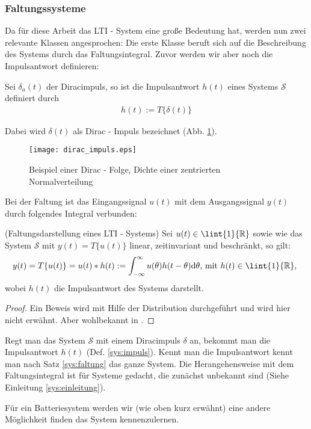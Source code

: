 \subsubsection{Faltungssysteme}
Da für diese Arbeit das LTI - System eine große Bedeutung hat, werden nun zwei relevante Klassen angesprochen: Die erste Klasse beruft sich auf die Beschreibung des Systems durch das Faltungsintegral. Zuvor werden wir aber noch die Impulsantwort definieren:
\begin{defi}\label{sys:impuls}
	Sei $\delta_a(t)$ der Diracimpuls, so ist die Impulsantwort $h(t)$ eines Systems $\mathscr{S}$ definiert durch 
	\begin{align}
		h(t) := T\{\delta(t)\}
	\end{align}
\end{defi}
Dabei wird $\delta(t) $ als Dirac - Impuls bezeichnet (Abb. \ref{fig:dirac}). 
\begin{figure}[ht]
	\texttt{[image: dirac\_impuls.eps]}
	\caption{Beispiel einer Dirac - Folge, Dichte einer zentrierten Normalverteilung}
	\label{fig:dirac}
\end{figure}
Bei der Faltung ist das Eingangssignal $u(t)$ mit dem Ausgangssignal $y(t)$ durch folgendes Integral verbunden:
\begin{satz}(Faltungsdarstellung eines LTI - Systems)\label{sys:faltung}
Sei $u(t) \in \lint{1}{\mathbb{\mathbb{R}}}$ sowie wie das System $\mathscr{S}$ mit $y(t) = T\{u(t)\}$ linear, zeitinvariant und beschränkt, so gilt:
\begin{align}
	y(t) = T\{u(t)\} = u(t) * h(t):= \int_{-\infty}^{\infty} u(\theta) h(t-\theta) \mathrm{d\theta} \text{, mit } h(t) \in \lint{1}{\mathbb{R}} \text{, }
\end{align}
wobei $h(t)$ die Impulsantwort des Systems darstellt. 
\begin{proof}
Ein Beweis wird mit Hilfe der Distribution durchgeführt und wird hier nicht erwähnt. Aber wohlbekannt in \cite{Rubin1991}.
\end{proof}
\end{satz}
\begin{bem}
Regt man das System $\mathscr{S}$ mit einem Diracimpuls $\delta$ an, bekommt man die Impulsantwort $h(t)$ (Def. \ref{sys:impuls}). Kennt man die Impulsantwort kennt man nach Satz \ref{sys:faltung} das ganze System. Die Herangehensweise mit dem Faltungsintegral ist für Systeme gedacht, die zunächst unbekannt sind (Siehe Einleitung \ref{sys:einleitung}). 
\end{bem}
\begin{bem}
Für ein Batteriesystem werden wir (wie oben kurz erwähnt) eine andere Möglichkeit finden das System kennenzulernen. 
\end{bem}
